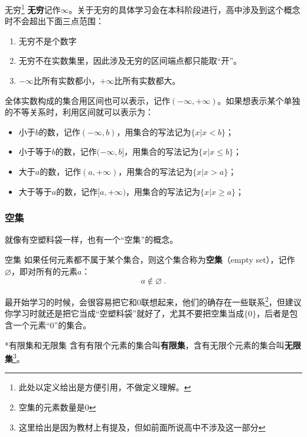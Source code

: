 \begin{definition}{无穷\footnote{此处以定义给出是方便引用，不做定义理解。}}
\textbf{无穷}记作$\infty$。关于无穷的具体学习会在本科阶段进行，高中涉及到这个概念时不会超出下面三点范围：
\begin{enumerate}
\item 无穷不是个数字
\item 无穷不在实数集里，因此涉及无穷的区间端点都只能取“开”。
\item $-\infty$比所有实数都小，$+\infty$比所有实数都大。
\end{enumerate}
\end{definition}

全体实数构成的集合用区间也可以表示，记作$(-\infty,+\infty)$。如果想表示某个单独的不等关系时，利用区间就可以表示为：
\begin{itemize}
\item 小于$b$的数，记作$(-\infty,b)$，用集合的写法记为$\{x|x< b\}$；
\item 小于等于$b$的数，记作$(-\infty,b]$，用集合的写法记为$\{x|x\leq b\}$；
\item 大于$a$的数，记作$(a,+\infty)$，用集合的写法记为$\{x|x> a\}$；
\item 大于等于$a$的数，记作$[a,+\infty)$，用集合的写法记为$\{x|x\geq a\}$；
\end{itemize}

\subsubsection{空集}

就像有空塑料袋一样，也有一个“空集”的概念。

\begin{definition}{空集}
如果任何元素都不属于某个集合，则这个集合称为\textbf{空集}（empty set），记作 $\varnothing$，即对所有的元素$a$：
\begin{equation}
a\notin\varnothing~.
\end{equation}
\end{definition}

最开始学习的时候，会很容易把它和$0$联想起来，他们的确存在一些联系\footnote{空集的元素数量是0}，但建议你学习时就还是把它当成“空塑料袋”就好了，尤其不要把空集当成$\{0\}$，后者是包含一个元素“$0$”的集合。

\begin{definition}{*有限集和无限集}
含有有限个元素的集合叫\textbf{有限集}，含有无限个元素的集合叫\textbf{无限集}\footnote{这里给出是因为教材上有提及，但如前面所说高中不涉及这一部分}。
\end{definition}

